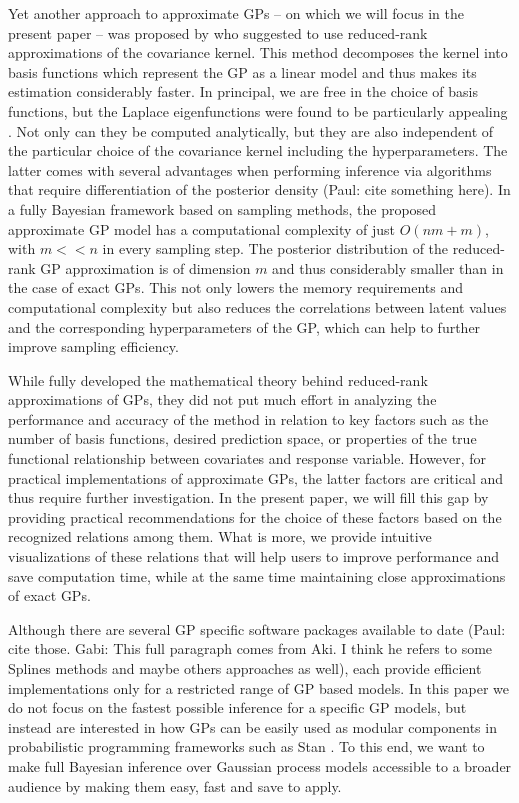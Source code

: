 \documentclass[]{interact}
\theoremstyle{plain}%
\theoremstyle{definition}
\theoremstyle{remark}
\begin{document}
Yet another approach to approximate GPs -- on which we will focus in the present paper -- was proposed by \cite{solin2018hilbert} who suggested to use reduced-rank approximations of the covariance kernel. This method decomposes the kernel into basis functions which represent the GP as a linear model and thus makes its estimation considerably faster. In principal, we are free in the choice of basis functions, but the Laplace eigenfunctions were found to be particularly appealing \citep{solin2018hilbert}. Not only can they be computed analytically, but they are also independent of the particular choice of the covariance kernel including the hyperparameters. The latter comes with several advantages when performing inference via algorithms that require differentiation of the posterior density (Paul: cite something here). In a fully Bayesian framework based on sampling methods, the proposed approximate GP model has a computational complexity of just $O(nm+m)$, with $m<<n$ in every sampling step. The posterior distribution of the reduced-rank GP approximation is of dimension $m$ and thus considerably smaller than in the case of exact GPs. This not only lowers the memory requirements and computational complexity but also reduces the correlations between latent values and the corresponding hyperparameters of the GP, which can help to further improve sampling efficiency.

While \cite{solin2018hilbert} fully developed the mathematical theory behind reduced-rank approximations of GPs, they did not put much effort in analyzing the performance and accuracy of the method in relation to key factors such as the number of basis functions, desired prediction space, or properties of the true functional relationship between covariates and response variable. However, for practical implementations of approximate GPs, the latter factors are critical and thus require further investigation. In the present paper, we will fill this gap by providing practical recommendations for the choice of these factors based on the recognized relations among them. What is more, we provide intuitive visualizations of these relations that will help users to improve performance and save computation time, while at the same time maintaining close approximations of exact GPs. 

Although there are several GP specific software packages available to date (Paul: cite those. Gabi: This full paragraph comes from Aki. I think he refers to some Splines methods and maybe others approaches as well), each provide efficient implementations only for a restricted range of GP based models. In this paper we do not focus on the fastest possible inference for a specific GP models, but instead are interested in how GPs can be easily used as modular components in probabilistic programming frameworks such as Stan \citep{carpenter2017stan}. To this end, we want to make full Bayesian inference over Gaussian process models accessible to a broader audience by making them easy, fast and save to apply. 
\end{document}
